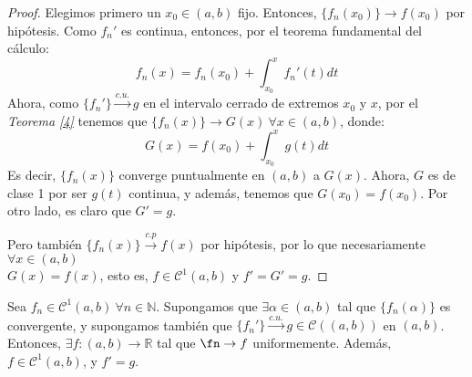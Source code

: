   \begin{proof}
    Elegimos primero un $x_0 \in (a,b)$ fijo. Entonces, $\{f_n(x_0)\} \to f(x_0)$ por hipótesis.
    Como $f_n'$ es continua, entonces, por el teorema fundamental del cálculo:
    \[
      f_n(x) = f_n(x_0) + \int_{x_0}^x f_n'(t)dt
    \]
    Ahora, como  $\{f_n'\} \xrightarrow{c.u.} g $ en el intervalo cerrado de extremos $x_0$ y $x$, por el \textit{Teorema \ref{4}} tenemos que $\{f_n(x)\} \to G(x)\ \forall x \in (a,b)$, donde:
    \[
      G(x) = f(x_0) + \int_{x_0}^x g(t)dt
    \]
    Es decir, $\{f_n(x)\}$ converge puntualmente en $(a,b)$ a $G(x)$. Ahora, $G$ es de clase 1 por ser $g(t)$ continua, y además, tenemos que $G(x_0) = f(x_0)$.
    Por otro lado, es claro que $G' = g$.

    Pero también $\{f_n(x)\} \xrightarrow {c.p} f(x)$ por hipótesis, por lo que necesariamente $\forall x \in (a,b)$ \\ $G(x) = f(x)$, esto es, $f \in \mathcal{C}^1(a,b)$ y $f' = G' = g$.
  \end{proof}

\begin{ncor}
  Sea $f_n\in \mathcal{C}^1(a,b) \ \forall n \in \mathbb{N}$. Supongamos que $\exists \alpha \in (a,b)$ tal que $ \{f_n(\alpha)\}$ es convergente, y supongamos también que $\{f_n'\} \xrightarrow{c.u.} g \in \mathcal C((a,b))$ en $(a,b)$. Entonces, $\exists f: (a,b) \to \mathbb{R}$ tal que $\fn \to f$ uniformemente. Además, $f \in \mathcal{C}^1(a,b)$, y  $f' = g$.
\end{ncor}

